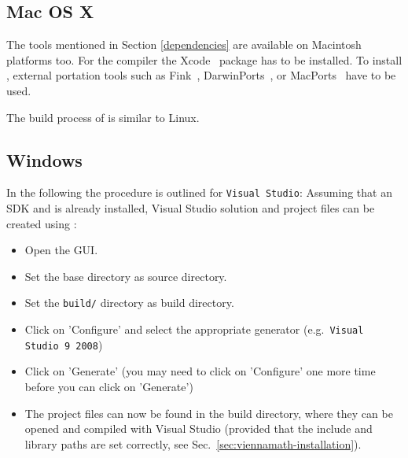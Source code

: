 
\subsection{Mac OS X}
\label{apple}
The tools mentioned in Section \ref{dependencies} are available on 
Macintosh platforms too. 
For the {\GCC} compiler the Xcode~\cite{xcode} package has to be installed.
To install {\CMake}, external portation tools such as
Fink~\cite{fink}, DarwinPorts~\cite{darwinports}, 
or MacPorts~\cite{macports} have to be used. 

The build process of {\ViennaMath} is similar to Linux.

\subsection{Windows}
In the following the procedure is outlined for \texttt{Visual Studio}: Assuming
that an {\OpenCL} SDK and {\CMake} is already installed, Visual Studio solution
and project files can be created using {\CMake}:
\begin{itemize}
\item Open the {\CMake} GUI.
\item Set the {\ViennaMath} base directory as source directory.
\item Set the \texttt{build/} directory as build directory.
\item Click on 'Configure' and select the appropriate generator
(e.g.~\texttt{Visual Studio 9 2008})
\item Click on 'Generate' (you may need to click on 'Configure' one more time
before you can click on 'Generate')
\item The project files can now be found in the {\ViennaMath} build directory,
where they can be opened and compiled with Visual Studio (provided that the
include and library paths are set correctly, see
Sec.~\ref{sec:viennamath-installation}).
\end{itemize}


























